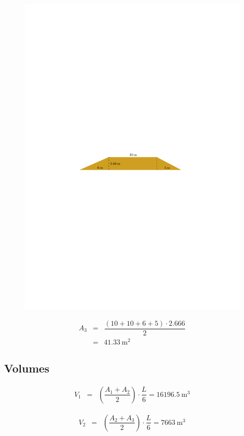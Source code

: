 \documentclass[a4paper, 12pt, brazilian]{article}
\begin{document}
	\begin{figure}[H]
		\centering
		\includegraphics[width=0.85\linewidth]{images/twolpersix}
		\label{fig:twolpersix}
	\end{figure}
	
	\begin{eqnarray}
		A_{3}&=&\dfrac{(10+10+6+5)\cdot 2.666}{2}\\
		&=&\SI{41.33}{\meter^{2}}
	\end{eqnarray}
	
	\subsection{Volumes}
	
	\begin{eqnarray}
		V_{1}&=&\left(\dfrac{A_{1}+A_{2}}{2}\right)\cdot\dfrac{L}{6}=\SI{16196.5}{\meter^{3}}
	\end{eqnarray}
	
	\begin{eqnarray}
		V_{2}&=&\left(\dfrac{A_{2}+A_{3}}{2}\right)\cdot\dfrac{L}{6}=\SI{7663}{\meter^{3}}	
	\end{eqnarray}
	
\end{document}
